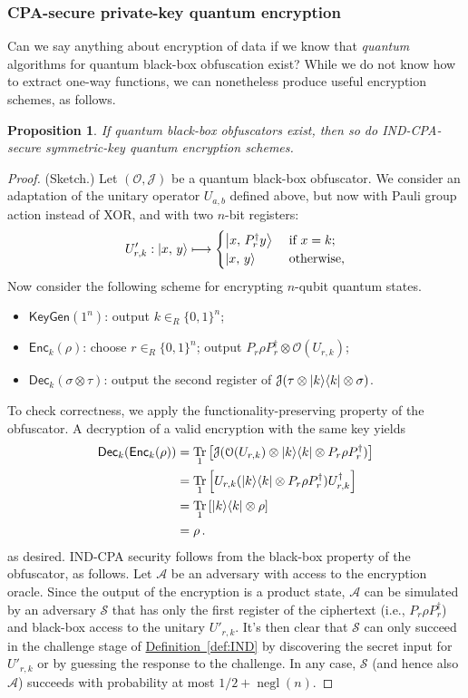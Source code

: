 \documentclass[envcountsame]{llncs}
\DeclareMathOperator{\tr}{Tr}
\numberwithin{equation}{section}
\newtheorem{prop}{Proposition}
\newcommand{\opn}{\operatorname}
\newcommand{\expref}[2]{\texorpdfstring{\hyperref[#2]{#1~\ref{#2}}}{#1~\ref{#2}}}
\newcommand{\algo}{\mathcal}
\newcommand{\negl}{\opn{negl}}
\newcommand{\KeyGen}{\ensuremath{\mathsf{KeyGen}}\xspace}
\newcommand{\Enc}{\ensuremath{\mathsf{Enc}}\xspace}
\newcommand{\Dec}{\ensuremath{\mathsf{Dec}}\xspace}
\newcommand{\inrand}{\in_R}
\begin{document}
\subsubsection{CPA-secure private-key quantum encryption}

Can we say anything about encryption of data if we know that \emph{quantum} algorithms for quantum black-box obfuscation exist? While we do not know how to extract one-way functions, we can nonetheless produce useful encryption schemes, as follows.

\begin{prop}\label{prop:PKE-from-SKE}
If quantum black-box obfuscators exist, then so do IND-CPA-secure symmetric-key quantum encryption schemes.
\end{prop}
\begin{proof} (Sketch.)
Let $(\algo O, \algo J)$ be a quantum black-box obfuscator. We consider an adaptation of the unitary operator $U_{a, b}$ defined above, but now with Pauli group action instead of XOR, and with two $n$-bit registers:
$$
U'_{r, k} : {\left\vert{x,\, y}\right\rangle} \longmapsto
\begin{cases}
{\left\vert{x,\, P_r^\dagger y}\right\rangle} &\text{ if } x = k;\\
{\left\vert{x,\, y}\right\rangle} &\text{ otherwise},
\end{cases}
$$
Now consider the following scheme for encrypting $n$-qubit quantum states.
\begin{itemize}
\item $\KeyGen(1^n)$: output $k \inrand \{0, 1\}^n$;
\item $\Enc_{k}(\rho)$: choose $r \inrand \{0, 1\}^n$; output $P_r \rho P_r^\dagger \otimes \algo O(U_{r, k})$;
\item $\Dec_{k}(\sigma \otimes \tau)$: output  the second register of $\algo J(\tau \otimes \ket{k}\bra{k} \otimes \sigma)$.
\end{itemize}
To check correctness, we apply the functionality-preserving property of the obfuscator. A decryption of a valid encryption with the same key yields
\begin{align*}
\Dec_k (\Enc_k (\rho))  
&= \tr_1 \left[\algo J(\algo O(U_{r, k}) \otimes \ket{k}\bra{k} \otimes P_r \rho P_r^\dagger)\right] \\
&= \tr_1 \left[U_{r, k} (\ket{k}\bra{k} \otimes P_r \rho P_r^\dagger) U_{r, k}^\dagger\right] \\
&= \tr_1 \left[\ket{k}\bra{k} \otimes \rho \right] \\
& = \rho\,.
\end{align*}
as desired. IND-CPA security follows from the black-box property of the obfuscator, as follows. Let $\algo A$ be an adversary with access to the encryption oracle. Since the output of the encryption is a product state, $\algo A$ can be simulated by an adversary $\algo S$ that has only the first register of the ciphertext (i.e., $P_r \rho P_r^\dagger$) and black-box access to the unitary $U'_{r, k}$. It's then clear that $\algo S$ can only succeed in the challenge stage of \expref{Definition}{def:IND} by discovering the secret input for $U'_{r, k}$ or by guessing the response to the challenge. In any case, $\algo S$ (and hence also $\algo A$) succeeds with probability at most $1/2 + \negl(n)$.
\end{proof}
\end{document}
